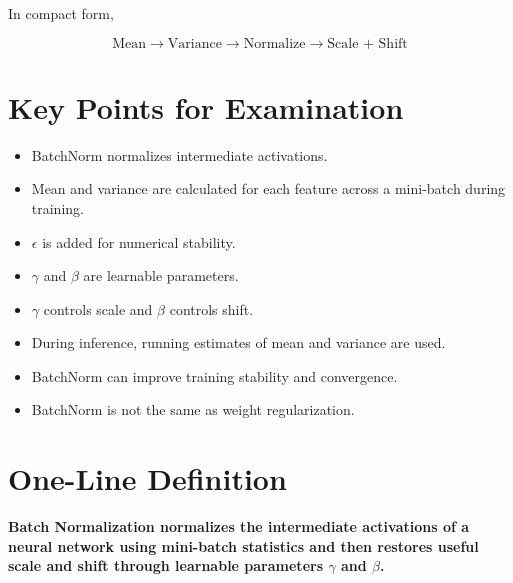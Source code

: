 \documentclass[11pt,a4paper]{article}
\begin{document}
	In compact form,
	
	\begin{equation}
		\boxed{
			\text{Mean}
			\rightarrow
			\text{Variance}
			\rightarrow
			\text{Normalize}
			\rightarrow
			\text{Scale + Shift}
		}
	\end{equation}
	
	\section{Key Points for Examination}
	
	\begin{itemize}[leftmargin=1.5em]
		\item BatchNorm normalizes intermediate activations.
		\item Mean and variance are calculated for each feature across a
		mini-batch during training.
		\item $\epsilon$ is added for numerical stability.
		\item $\gamma$ and $\beta$ are learnable parameters.
		\item $\gamma$ controls scale and $\beta$ controls shift.
		\item During inference, running estimates of mean and variance are used.
		\item BatchNorm can improve training stability and convergence.
		\item BatchNorm is not the same as weight regularization.
	\end{itemize}
	
	\section{One-Line Definition}
	
	\begin{tcolorbox}[
		colback=lightblue,
		colframe=titleblue,
		boxrule=1pt,
		arc=4pt
		]
		\centering
		\large
		\textbf{
			Batch Normalization normalizes the intermediate activations of a
			neural network using mini-batch statistics and then restores useful
			scale and shift through learnable parameters $\gamma$ and $\beta$.
		}
	\end{tcolorbox}
	
\end{document}
